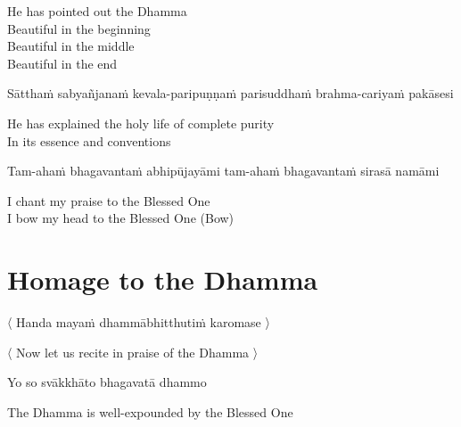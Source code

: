 \begin{english}
  He has pointed out the Dhamma\\
  Beautiful in the beginning\\
  Beautiful in the middle\\
  Beautiful in the end\\
\end{english}

\begin{pali-hang}
  Sātthaṁ sabyañjanaṁ kevala-paripuṇṇaṁ parisuddhaṁ brahma-cariyaṁ pakāsesi
\end{pali-hang}

\begin{english}
  He has explained the holy life of complete purity\hyperlink{endnote4-appendix}{\hypertarget{endnote4-body}{}}\\
  In its essence and conventions
\end{english}

\begin{pali-hang}
  Tam-ahaṁ bhagavantaṁ abhipūjayāmi tam-ahaṁ bhagavantaṁ sirasā namāmi
\end{pali-hang}

\begin{english}
  I chant my praise to the Blessed One\\
  I bow my head to the Blessed One \hfill{(Bow)}
\end{english}

\section{Homage to the Dhamma}
\label{homage-dhamma}

\begin{leader}
  〈 Handa mayaṁ dhammābhitthutiṁ karomase 〉
\end{leader}
\begin{leader-english}
  〈 Now let us recite in praise of the Dhamma 〉
\end{leader-english}

Yo so svākkhāto bhagavatā dhammo

\begin{english}
  The Dhamma is well-expounded by the Blessed One
\end{english}

